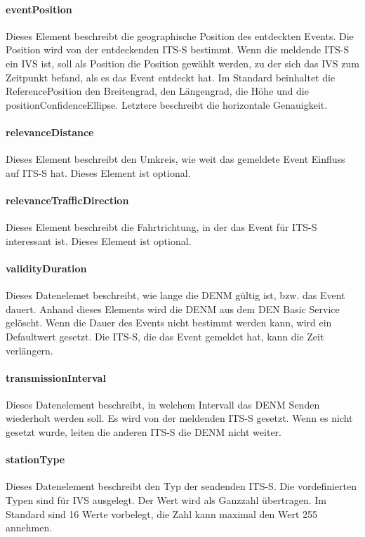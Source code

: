 \paragraph{eventPosition}
Dieses Element beschreibt die geographische Position des entdeckten Events. Die Position wird von der entdeckenden \ac{ITS-S} bestimmt. Wenn die meldende \ac{ITS-S} ein \ac{IVS} ist, soll als Position die Position gewählt werden, zu der sich das \ac{IVS} zum Zeitpunkt befand, als es das Event entdeckt hat. Im Standard \cite{ts102894-2} beinhaltet die ReferencePosition den Breitengrad, den Längengrad, die Höhe und die positionConfidenceEllipse. Letztere beschreibt die horizontale Genauigkeit.


\paragraph{relevanceDistance}
Dieses Element beschreibt den Umkreis, wie weit das gemeldete Event Einfluss auf \ac{ITS-S} hat. Dieses Element ist optional. 

\paragraph{relevanceTrafficDirection}
Dieses Element beschreibt die Fahrtrichtung, in der das Event für \ac{ITS-S} interessant ist. Dieses Element ist optional. 

\paragraph{validityDuration}
Dieses Datenelemet   beschreibt, wie lange die \ac{DENM} gültig ist, bzw. das Event dauert. Anhand dieses Elements wird die \ac{DENM} aus dem \ac{DEN} Basic Service gelöscht. Wenn die Dauer des Events nicht bestimmt werden kann, wird ein Defaultwert gesetzt. Die \ac{ITS-S}, die das Event gemeldet hat, kann die Zeit verlängern.  

\paragraph{transmissionInterval}
Dieses Datenelement beschreibt, in welchem Intervall das \ac{DENM} Senden wiederholt werden soll. Es wird von der meldenden \ac{ITS-S} gesetzt. Wenn es nicht gesetzt wurde, leiten die anderen \ac{ITS-S} die \ac{DENM} nicht weiter. 

\paragraph{stationType}
Dieses Datenelement beschreibt den Typ der sendenden \ac{ITS-S}. Die vordefinierten Typen sind für \ac{IVS} ausgelegt. Der Wert wird als Ganzzahl übertragen. Im Standard \cite{ts102894-2} sind  16 Werte vorbelegt, die Zahl kann maximal den Wert 255 annehmen.



